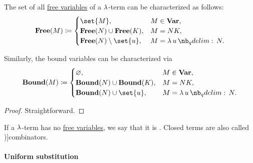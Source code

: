 \begin{proposition}\label{thm:lambda_variable_freeness_characterization}
  The set of all \hyperref[def:lambda_variable_freeness]{free variables} of a \( \mathrm{\lambda} \)-term can be characterized as follows:
  \begin{equation*}
    \op*{Free}(M) \coloneqq \begin{cases}
      \set{ M },                         &M \in \op*{Var}, \\
      \op*{Free}(N) \cup \op*{Free}(K),  &M = N K, \\
      \op*{Free}(N) \setminus \set{ u }, &M = \qabs u N. \\
    \end{cases}
  \end{equation*}

  Similarly, the bound variables can be characterized via
  \begin{equation*}
    \op*{Bound}(M) \coloneqq \begin{cases}
      \varnothing,                        &M \in \op*{Var}, \\
      \op*{Bound}(N) \cup \op*{Bound}(K), &M = N K, \\
      \op*{Bound}(N) \cup \set{ u },      &M = \qabs u N. \\
    \end{cases}
  \end{equation*}
\end{proposition}
\begin{proof}
  Straightforward.
\end{proof}

\begin{definition}\label{def:lambda_combinator}
  If a \( \mathrm{\lambda} \)-term has no \hyperref[def:lambda_variable_freeness]{free variables}, we say that it is . Closed terms are also called \term[ru=комбинаторы (\cite[188]{Герасимов2011})]{combinators}.
\end{definition}

\paragraph{Uniform substitution}

